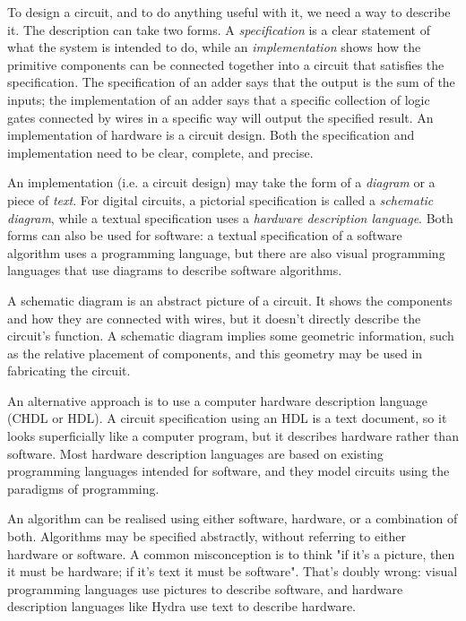 \documentclass[11pt]{article}
\begin{document}
To design a circuit, and to do anything useful with it, we need a way
to describe it.  The description can take two forms.  A
\emph{specification} is a clear statement of what the system is intended to
do, while an \emph{implementation} shows how the primitive components can
be connected together into a circuit that satisfies the specification.
The specification of an adder says that the output is the sum of the
inputs; the implementation of an adder says that a specific collection
of logic gates connected by wires in a specific way will output the
specified result.  An implementation of hardware is a circuit design.
Both the specification and implementation need to be clear, complete,
and precise.

An implementation (i.e. a circuit design) may take the form of a
\emph{diagram} or a piece of \emph{text}.  For digital circuits, a pictorial
specification is called a \emph{schematic diagram}, while a textual
specification uses a \emph{hardware description language}.  Both forms can
also be used for software: a textual specification of a software
algorithm uses a programming language, but there are also visual
programming languages that use diagrams to describe software
algorithms.

A schematic diagram is an abstract picture of a circuit.  It shows the
components and how they are connected with wires, but it doesn't
directly describe the circuit's function.  A schematic diagram implies
some geometric information, such as the relative placement of
components, and this geometry may be used in fabricating the circuit.

An alternative approach is to use a computer hardware description
language (CHDL or HDL).  A circuit specification using an HDL is a
text document, so it looks superficially like a computer program, but
it describes hardware rather than software.  Most hardware description
languages are based on existing programming languages intended for
software, and they model circuits using the paradigms of programming.

An algorithm can be realised using either software, hardware, or a
combination of both.  Algorithms may be specified abstractly, without
referring to either hardware or software.  A common misconception is
to think "if it's a picture, then it must be hardware; if it's text it
must be software".  That's doubly wrong: visual programming languages
use pictures to describe software, and hardware description languages
like Hydra use text to describe hardware.
\end{document}
